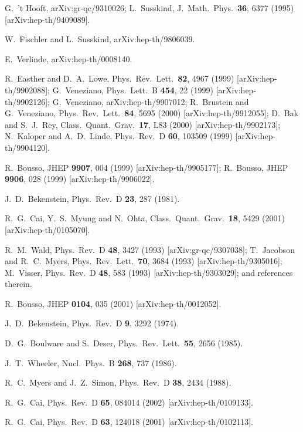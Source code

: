 \documentclass[a4paper,12pt]{article}
\begin{document}
\begin{thebibliography}{99}
G.~'t Hooft,
arXiv:gr-qc/9310026;
L.~Susskind,
J.\ Math.\ Phys.\  {\bf 36}, 6377 (1995) [arXiv:hep-th/9409089].

 W.~Fischler and L.~Susskind,
arXiv:hep-th/9806039.

E.~Verlinde,
arXiv:hep-th/0008140.

R.~Easther and D.~A.~Lowe,
Phys.\ Rev.\ Lett.\  {\bf 82}, 4967 (1999) [arXiv:hep-th/9902088];
G.~Veneziano,
Phys.\ Lett.\ B {\bf 454}, 22 (1999) [arXiv:hep-th/9902126];
G.~Veneziano,
arXiv:hep-th/9907012;
R.~Brustein and G.~Veneziano,
Phys.\ Rev.\ Lett.\  {\bf 84}, 5695 (2000) [arXiv:hep-th/9912055];
D.~Bak and S.~J.~Rey,
Class.\ Quant.\ Grav.\  {\bf 17}, L83 (2000)
[arXiv:hep-th/9902173];
N.~Kaloper and A.~D.~Linde,
Phys.\ Rev.\ D {\bf 60}, 103509 (1999) [arXiv:hep-th/9904120].

R.~Bousso,
JHEP {\bf 9907}, 004 (1999) [arXiv:hep-th/9905177];
R.~Bousso,
JHEP {\bf 9906}, 028 (1999) [arXiv:hep-th/9906022].

J.~D.~Bekenstein,
Phys.\ Rev.\ D {\bf 23}, 287 (1981).

R.~G.~Cai, Y.~S.~Myung and N.~Ohta,
Class.\ Quant.\ Grav.\  {\bf 18}, 5429 (2001)
[arXiv:hep-th/0105070].


R.~M.~Wald,
Phys.\ Rev.\ D {\bf 48}, 3427 (1993)
[arXiv:gr-qc/9307038];
T.~Jacobson and R.~C.~Myers,
Phys.\ Rev.\ Lett.\  {\bf 70}, 3684 (1993) [arXiv:hep-th/9305016];
M.~Visser,
Phys.\ Rev.\ D {\bf 48}, 583 (1993)
[arXiv:hep-th/9303029];
and references therein.

R.~Bousso,
JHEP {\bf 0104}, 035 (2001)
[arXiv:hep-th/0012052].

J.~D.~Bekenstein,
Phys.\ Rev.\ D {\bf 9}, 3292 (1974).

D.~G.~Boulware and S.~Deser,
Phys.\ Rev.\ Lett.\  {\bf 55}, 2656 (1985).

J.~T.~Wheeler,
Nucl.\ Phys.\ B {\bf 268}, 737 (1986).

R.~C.~Myers and J.~Z.~Simon,
Phys.\ Rev.\ D {\bf 38}, 2434 (1988).

R.~G.~Cai,
Phys.\ Rev.\ D {\bf 65}, 084014 (2002)
[arXiv:hep-th/0109133].

R.~G.~Cai,
Phys.\ Rev.\ D {\bf 63}, 124018 (2001)
[arXiv:hep-th/0102113].

\end{thebibliography}
\end{document}
